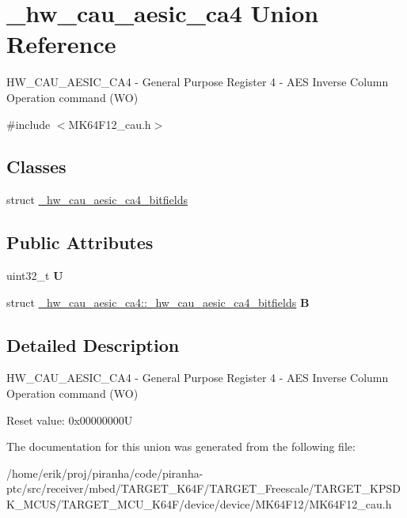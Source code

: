 \hypertarget{union__hw__cau__aesic__ca4}{}\section{\+\_\+hw\+\_\+cau\+\_\+aesic\+\_\+ca4 Union Reference}
\label{union__hw__cau__aesic__ca4}


H\+W\+\_\+\+C\+A\+U\+\_\+\+A\+E\+S\+I\+C\+\_\+\+C\+A4 -\/ General Purpose Register 4 -\/ A\+ES Inverse Column Operation command (WO)  




{\ttfamily \#include $<$M\+K64\+F12\+\_\+cau.\+h$>$}

\subsection*{Classes}
\begin{DoxyCompactItemize}
\item 
struct \hyperlink{struct__hw__cau__aesic__ca4_1_1__hw__cau__aesic__ca4__bitfields}{\+\_\+hw\+\_\+cau\+\_\+aesic\+\_\+ca4\+\_\+bitfields}
\end{DoxyCompactItemize}
\subsection*{Public Attributes}
\begin{DoxyCompactItemize}
\item 
uint32\+\_\+t {\bfseries U}\hypertarget{union__hw__cau__aesic__ca4_a9ad1d7b9919aa4ce195bcffa2a81d61d}{}\label{union__hw__cau__aesic__ca4_a9ad1d7b9919aa4ce195bcffa2a81d61d}

\item 
struct \hyperlink{struct__hw__cau__aesic__ca4_1_1__hw__cau__aesic__ca4__bitfields}{\+\_\+hw\+\_\+cau\+\_\+aesic\+\_\+ca4\+::\+\_\+hw\+\_\+cau\+\_\+aesic\+\_\+ca4\+\_\+bitfields} {\bfseries B}\hypertarget{union__hw__cau__aesic__ca4_acfbbbb9c435b67c69c2cfa33c146f5e8}{}\label{union__hw__cau__aesic__ca4_acfbbbb9c435b67c69c2cfa33c146f5e8}

\end{DoxyCompactItemize}


\subsection{Detailed Description}
H\+W\+\_\+\+C\+A\+U\+\_\+\+A\+E\+S\+I\+C\+\_\+\+C\+A4 -\/ General Purpose Register 4 -\/ A\+ES Inverse Column Operation command (WO) 

Reset value\+: 0x00000000U 

The documentation for this union was generated from the following file\+:\begin{DoxyCompactItemize}
\item 
/home/erik/proj/piranha/code/piranha-\/ptc/src/receiver/mbed/\+T\+A\+R\+G\+E\+T\+\_\+\+K64\+F/\+T\+A\+R\+G\+E\+T\+\_\+\+Freescale/\+T\+A\+R\+G\+E\+T\+\_\+\+K\+P\+S\+D\+K\+\_\+\+M\+C\+U\+S/\+T\+A\+R\+G\+E\+T\+\_\+\+M\+C\+U\+\_\+\+K64\+F/device/device/\+M\+K64\+F12/M\+K64\+F12\+\_\+cau.\+h\end{DoxyCompactItemize}
